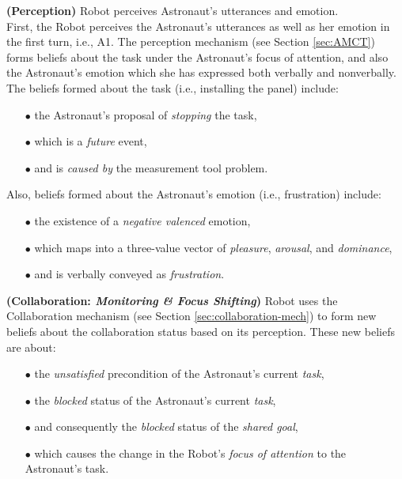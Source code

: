\noindent\item \textbf{(Perception)} Robot perceives Astronaut's utterances and
emotion.\\
  
First, the Robot perceives the Astronaut's utterances as well as her emotion in
the first turn, i.e., A1. The perception mechanism (see Section \ref{sec:AMCT})
forms beliefs about the task under the Astronaut's focus of attention, and also
the Astronaut's emotion which she has expressed both verbally and nonverbally.
The beliefs formed about the task (i.e., installing the panel) include:

\begin{itemize}
  \item[$\bullet$] the Astronaut's proposal of \textit{stopping} the task,
  \item[$\bullet$] which is a \textit{future} event,
  \item[$\bullet$] and is \textit{caused by} the measurement tool problem.
\end{itemize}

\noindent Also, beliefs formed about the Astronaut's emotion (i.e., frustration)
include:

\begin{itemize}
  \item[$\bullet$] the existence of a \textit{negative valenced} emotion,
  \item[$\bullet$] which maps into a three-value vector of \textit{pleasure},
  \textit{arousal}, and \textit{dominance},
  \item[$\bullet$] and is verbally conveyed as \textit{frustration}.\\
\end{itemize}

\noindent\textbf{(Collaboration: \textit{Monitoring \& Focus Shifting})} Robot
uses the Collaboration mechanism (see Section \ref{sec:collaboration-mech}) to
form new beliefs about the collaboration status based on its perception. These
new beliefs are about:

\begin{itemize}
  \item[$\bullet$] the \textit{unsatisfied} precondition of the Astronaut's
  current \textit{task},
  \item[$\bullet$] the \textit{blocked} status of the Astronaut's current
  \textit{task},
  \item[$\bullet$] and consequently the \textit{blocked} status of the
  \textit{shared goal},
  \item[$\bullet$] which causes the change in the Robot's \textit{focus of
  attention} to the Astronaut's task.
\end{itemize}

